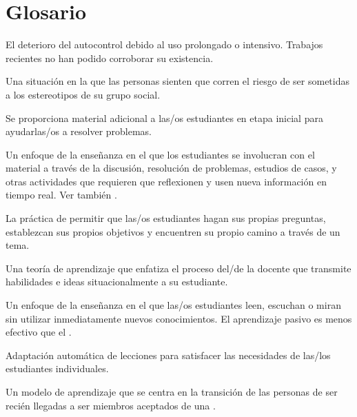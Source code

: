 \chapter{Glosario}\label{s:gloss}

\begin{description}

 El deterioro del autocontrol debido al uso prolongado o intensivo.
Trabajos recientes no han podido corroborar su existencia.

 Una situación en la que las personas sienten que corren el riesgo de ser sometidas a los estereotipos de su grupo social.

 Se proporciona material adicional a las/os estudiantes
en etapa inicial para ayudarlas/os a resolver problemas.

 Un enfoque de la enseñanza en el que
los estudiantes se involucran con el material a través de la discusión, resolución de problemas, estudios de casos,
y otras actividades que requieren que reflexionen y usen nueva información en
tiempo real. Ver también .

 La práctica de permitir que las/os estudiantes hagan sus propias preguntas, establezcan sus propios objetivos y encuentren su propio camino a través de un tema.

 Una teoría de
aprendizaje que enfatiza el proceso del/de la docente que transmite habilidades e ideas
situacionalmente  a su estudiante.

 Un enfoque de la enseñanza en el que las/os estudiantes leen, escuchan o miran sin utilizar inmediatamente nuevos conocimientos. El aprendizaje pasivo es menos efectivo que el .

 Adaptación automática de lecciones para satisfacer las necesidades de las/los estudiantes individuales.

 Un modelo de aprendizaje que se centra en la transición de las personas de ser recién llegadas a ser miembros aceptados de una
.


\end{description}
